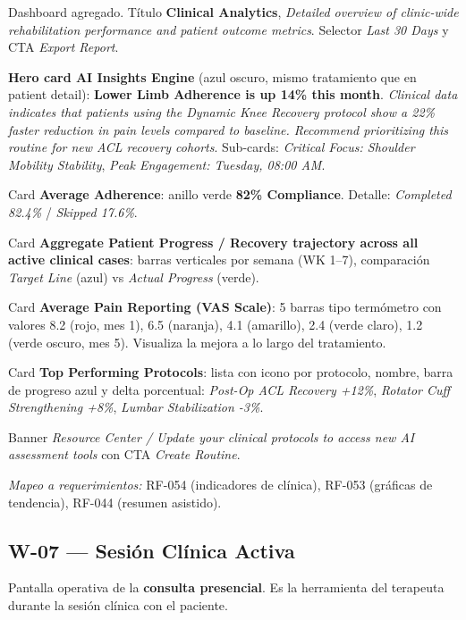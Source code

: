 Dashboard agregado. Título \textbf{Clinical Analytics}, \textit{Detailed overview of clinic-wide rehabilitation performance and patient outcome metrics}. Selector \textit{Last 30 Days} y CTA \textit{Export Report}.

\textbf{Hero card AI Insights Engine} (azul oscuro, mismo tratamiento que en patient detail): \textbf{Lower Limb Adherence is up 14\% this month}. \textit{Clinical data indicates that patients using the Dynamic Knee Recovery protocol show a 22\% faster reduction in pain levels compared to baseline. Recommend prioritizing this routine for new ACL recovery cohorts}. Sub-cards: \textit{Critical Focus: Shoulder Mobility Stability}, \textit{Peak Engagement: Tuesday, 08:00 AM}.

Card \textbf{Average Adherence}: anillo verde \textbf{82\% Compliance}. Detalle: \textit{Completed 82.4\%} / \textit{Skipped 17.6\%}.

Card \textbf{Aggregate Patient Progress / Recovery trajectory across all active clinical cases}: barras verticales por semana (WK 1--7), comparación \textit{Target Line} (azul) vs \textit{Actual Progress} (verde).

Card \textbf{Average Pain Reporting (VAS Scale)}: 5 barras tipo termómetro con valores 8.2 (rojo, mes 1), 6.5 (naranja), 4.1 (amarillo), 2.4 (verde claro), 1.2 (verde oscuro, mes 5). Visualiza la mejora a lo largo del tratamiento.

Card \textbf{Top Performing Protocols}: lista con icono por protocolo, nombre, barra de progreso azul y delta porcentual: \textit{Post-Op ACL Recovery +12\%}, \textit{Rotator Cuff Strengthening +8\%}, \textit{Lumbar Stabilization -3\%}.

Banner \textit{Resource Center / Update your clinical protocols to access new AI assessment tools} con CTA \textit{Create Routine}.

\textit{Mapeo a requerimientos:} RF-054 (indicadores de clínica), RF-053 (gráficas de tendencia), RF-044 (resumen asistido).


\subsection{W-07 --- Sesión Clínica Activa}

Pantalla operativa de la \textbf{consulta presencial}. Es la herramienta del terapeuta durante la sesión clínica con el paciente.


